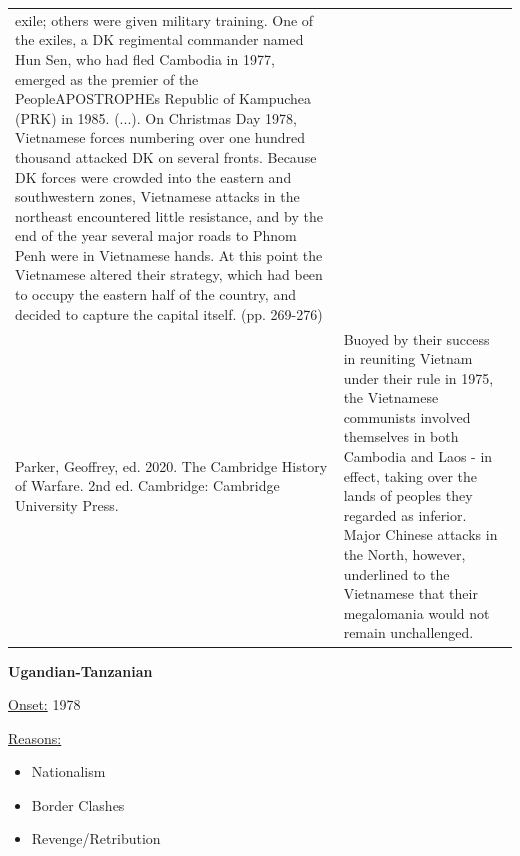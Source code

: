 {\begin{longtable}{p{}p{}}
exile; others were given military training. One of the exiles, a DK regimental commander named Hun Sen, who had fled Cambodia in 1977, emerged as the premier of the PeopleAPOSTROPHEs Republic of Kampuchea (PRK) in 1985. (...). On Christmas Day 1978, Vietnamese forces numbering over one hundred thousand attacked DK on several fronts. Because DK forces were crowded into the eastern and southwestern zones, Vietnamese attacks in the northeast encountered little resistance, and by the end of the year several major roads to Phnom Penh were in Vietnamese hands. At this point the Vietnamese altered their strategy, which had been to occupy the eastern half of the country, and decided to capture the capital itself. (pp. 269-276)
\\
Parker, Geoffrey, ed. 2020. The Cambridge History of Warfare. 2nd ed. Cambridge: Cambridge University Press. & Buoyed by their success in reuniting Vietnam under their rule in 1975, the Vietnamese communists involved themselves in both Cambodia and Laos - in effect, taking over the lands of peoples they regarded as inferior. Major Chinese attacks in the North, however, underlined to the Vietnamese that their megalomania would not remain unchallenged.
\\
\end{longtable}}
\clearpage
         \textbf{Ugandian-Tanzanian} 

          \underline{Onset:} 1978         

\underline{Reasons:}
\begin{itemize}
\item Nationalism
\item Border Clashes
\item Revenge/Retribution
\end{itemize}

